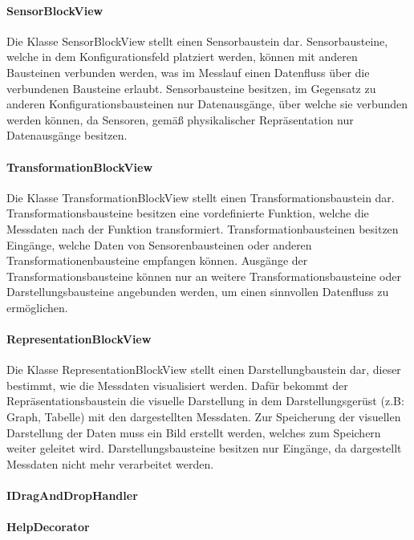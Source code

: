 \documentclass[parskip=full]{scrartcl}
\begin{document}
\paragraph{SensorBlockView}
Die Klasse SensorBlockView stellt einen Sensorbaustein dar. 
Sensorbausteine, welche in dem Konfigurationsfeld platziert werden, können mit anderen Bausteinen verbunden werden, was im Messlauf einen Datenfluss über die verbundenen Bausteine erlaubt. Sensorbausteine besitzen, im Gegensatz zu anderen Konfigurationsbausteinen nur Datenausgänge, über welche sie verbunden werden können, da Sensoren, gemäß physikalischer 
Repräsentation nur Datenausgänge besitzen.

\paragraph{TransformationBlockView}
Die Klasse TransformationBlockView stellt einen Transformationsbaustein dar. Transformationsbausteine besitzen eine vordefinierte Funktion, welche die Messdaten nach der Funktion transformiert. Transformationbausteinen besitzen Eingänge, welche Daten von Sensorenbausteinen oder anderen Transformationenbausteine empfangen können. Ausgänge der Transformationsbausteine können nur an weitere Transformationsbausteine oder Darstellungsbausteine angebunden werden, um einen sinnvollen Datenfluss zu ermöglichen.

\paragraph{RepresentationBlockView} 

Die Klasse RepresentationBlockView stellt einen Darstellungbaustein dar, dieser bestimmt, wie die Messdaten visualisiert werden. Dafür bekommt der Repräsentationsbaustein die visuelle Darstellung in dem Darstellungsgerüst (z.B: Graph, Tabelle) mit den dargestellten Messdaten.
Zur Speicherung der visuellen Darstellung der Daten muss ein Bild erstellt werden, welches zum Speichern weiter geleitet wird.
Darstellungsbausteine besitzen nur Eingänge, da dargestellt Messdaten nicht mehr verarbeitet werden. 

\paragraph{IDragAndDropHandler}

\paragraph{HelpDecorator}
\end{document}
